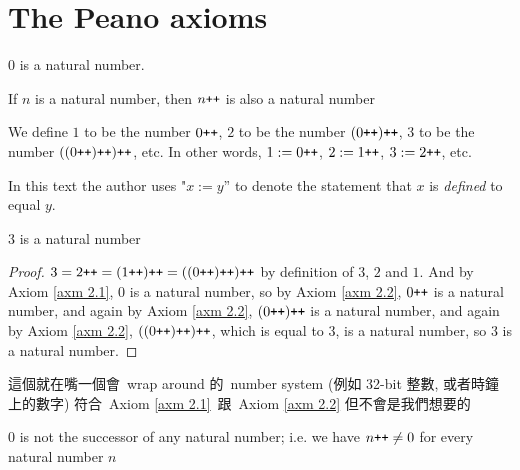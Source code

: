\section{The Peano axioms}\label{sec 2.1}

\begin{axiom}\label{axm 2.1}
\( 0 \) is a natural number.
\end{axiom}
\begin{axiom}\label{axm 2.2}
If \( n \) is a natural number, then \( n\texttt{++} \) is also a natural number
\end{axiom}

\setcounter{theorem}{2}
\begin{definition}\label{def 2.1.3}
We define \( 1 \) to be the number \( 0\texttt{++} \), \(2\) to be the number \( (0\texttt{++})\texttt{++} \), 3 to be the number \( ((0\texttt{++})\texttt{++})\texttt{++} \), etc. In other words, \( 1 := 0\texttt{++} \), \( 2 := 1\texttt{++} \), \( 3 := 2\texttt{++} \), etc.
\end{definition}

\begin{note}
In this text the author uses "\(x := y\)” to denote the statement that \(x\) is \emph{defined} to equal \(y\).
\end{note}

\begin{proposition}\label{prop 2.1.4}
3 is a natural number
\end{proposition}
\begin{proof}
\( 3 = 2\texttt{++} = (1\texttt{++})\texttt{++} = ((0\texttt{++})\texttt{++})\texttt{++} \) by definition of \(3\), \(2\) and \(1\). And by Axiom \ref{axm 2.1}, \(0\) is a natural number, so by Axiom \ref{axm 2.2}, \(0\texttt{++}\) is a natural number, and again by Axiom \ref{axm 2.2}, \((0\texttt{++})\texttt{++}\) is a natural number, and again by Axiom \ref{axm 2.2}, \( ((0\texttt{++})\texttt{++})\texttt{++} \), which is equal to \(3\), is a natural number, so \(3\) is a natural number.
\end{proof}

\begin{example}\label{example 2.1.5}
這個就在嘴一個會\ wrap around 的\ number system (例如 32-bit 整數, 或者時鐘上的數字) 符合\ Axiom \ref{axm 2.1}\ 跟\ Axiom \ref{axm 2.2} 但不會是我們想要的
\end{example}

\begin{axiom}\label{axm 2.3}
\(0\) is not the successor of any natural number; i.e. we have \(n\texttt{++} \neq 0\) for every natural number \(n\)
\end{axiom}

